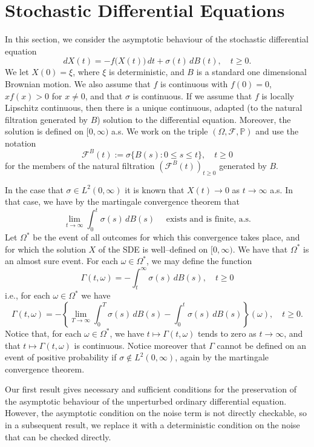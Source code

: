 \documentclass[a4paper,10pt,reqno]{amsart}
\numberwithin{equation}{section}
\theoremstyle{definition}
\theoremstyle{remark}
\DeclareMathOperator{\1}{\mathbbm 1}
\begin{document}
	\section{Stochastic Differential Equations}
	In this section, we consider the asymptotic behaviour of the stochastic differential equation 
	\begin{equation}  \label{eq.sde7}
		dX(t) = -f\big(X(t)\big)\,dt + \sigma(t)\,dB(t), \quad t\geq 0.
	\end{equation}
	We let $X(0)=\xi$, where $\xi$ is deterministic, and $B$ is a standard one dimensional Brownian motion. We also assume that $f$ is continuous with $f(0)=0$, $xf(x)>0$ for $x\neq 0$, and that $\sigma$ is continuous. If we assume that $f$ is locally Lipschitz continuous, then there is a unique continuous, adapted (to the natural filtration generated by $B$) solution to the differential equation. Moreover, the solution is defined on $[0,\infty)$ a.s. We work on the triple $(\Omega,\mathcal{F},\mathbb{P})$ and use the notation 
	\[
	\mathcal{F}^B(t):=\sigma\{ B(s): 0\leq s\leq t\}, \quad t\geq 0
	\] 
	for the members of the natural filtration $(\mathcal{F}^B(t))_{t\geq 0}$ generated by $B$. 
	
	In the case that $\sigma\in L^2(0,\infty)$ it is known that $X(t)\to 0$ as $t\to\infty$ a.s. In that case, we have by the martingale convergence theorem that 
	\[
	\lim_{t\to\infty} \int_0^t \sigma(s)\,dB(s) \quad \text{ exists and is finite, a.s.}
	\]
	Let $\Omega^\ast$ be the event of all outcomes for which this convergence takes place, and for which the solution $X$ of the SDE is well--defined on $[0,\infty)$. We have that $\Omega^\ast$ is an almost sure event. For each 
	$\omega\in \Omega^\ast$, we may define the function 
	\[
	\Gamma(t,\omega) = -\int_{t}^{\infty} \sigma(s)\, dB(s),\quad t\geq 0
	\]
	i.e., for each $\omega\in \Omega^\ast$ we have 
	\[
	\Gamma(t,\omega) = -\left\{ \lim_{T \to \infty} \int_{0}^{T} \sigma(s)\, dB(s) - \int_{0}^{t} \sigma(s)\, dB(s) \right\}(\omega), \quad t\geq 0.
	\]
	Notice that, for each $\omega\in \Omega^\ast$, we have $t\mapsto \Gamma(t,\omega)$ tends to zero as $t\to\infty$, and that $t\mapsto \Gamma(t,\omega)$ is continuous. Notice moreover that $\Gamma$ cannot be defined on an event of positive probability if $\sigma\not\in L^2(0,\infty)$, again by the martingale convergence theorem. 
	
	Our first result gives necessary and sufficient conditions for the preservation of the asymptotic behaviour of the unperturbed ordinary differential equation. However, the asymptotic condition on the noise term is not directly checkable, so in a subsequent result, we replace it with a deterministic condition on the noise that can be checked directly.
	
\end{document}

